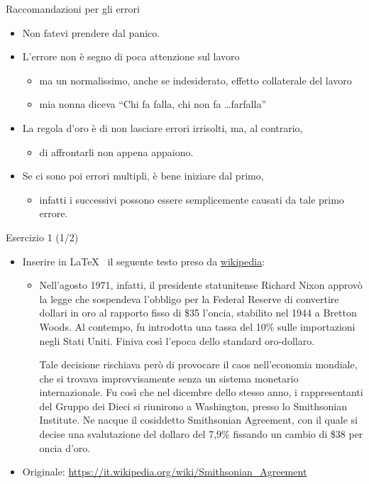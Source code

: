 \documentclass{beamer}
\begin{document}
\begin{frame}[fragile]{\centerline{Raccomandazioni per gli errori}}
\begin{itemize}
\item Non fatevi prendere dal panico.
\item L'errore non \`{e} segno di poca attenzione sul lavoro
\begin{itemize}
\item \normalsize ma un normalissimo, anche se indesiderato, effetto collaterale del lavoro
\item mia nonna diceva ``Chi fa falla, chi non fa \ldots farfalla''
\end{itemize}
\item La regola d'oro \`{e} di non lasciare errori irrisolti, ma, al contrario,
\begin{itemize}
\item \normalsize di affrontarli non appena appaiono.
\end{itemize}
\item Se ci sono poi errori multipli, \`{e} bene iniziare dal primo, \begin{itemize}
\item \normalsize infatti i successivi possono essere semplicemente causati da tale primo errore.
\end{itemize}
\end{itemize}
\end{frame}


\begin{frame}[fragile]{\centerline{Esercizio 1 (1/2)}}
\begin{itemize}
    \item Inserire in \LaTeX ~ il seguente testo preso da \hyperlink{https://it.wikipedia.org/wiki/Smithsonian_Agreement}{wikipedia}:
    \begin{itemize}
\item Nell'agosto 1971, infatti, il presidente statunitense Richard Nixon approv\`{o} la legge che sospendeva l'obbligo per la Federal Reserve di convertire dollari in oro al rapporto fisso di \$35 l'oncia, stabilito nel 1944 a Bretton Woods. Al contempo, fu introdotta una tassa del 10\% sulle importazioni negli Stati Uniti. Finiva così l'epoca dello standard oro-dollaro.

Tale decisione rischiava per\`{o} di provocare il caos nell'economia mondiale, che si trovava improvvisamente senza un sistema monetario internazionale. Fu cos\`{i} che nel dicembre dello stesso anno, i rappresentanti del Gruppo dei Dieci si riunirono a Washington, presso lo Smithsonian Institute. Ne nacque il cosiddetto Smithsonian Agreement, con il quale si decise una svalutazione del dollaro del 7,9\%
fissando un cambio di \$38 per oncia d'oro.
\end{itemize}
\item Originale: \url{https://it.wikipedia.org/wiki/Smithsonian_Agreement}
\end{itemize}
\end{frame}
\end{document}
